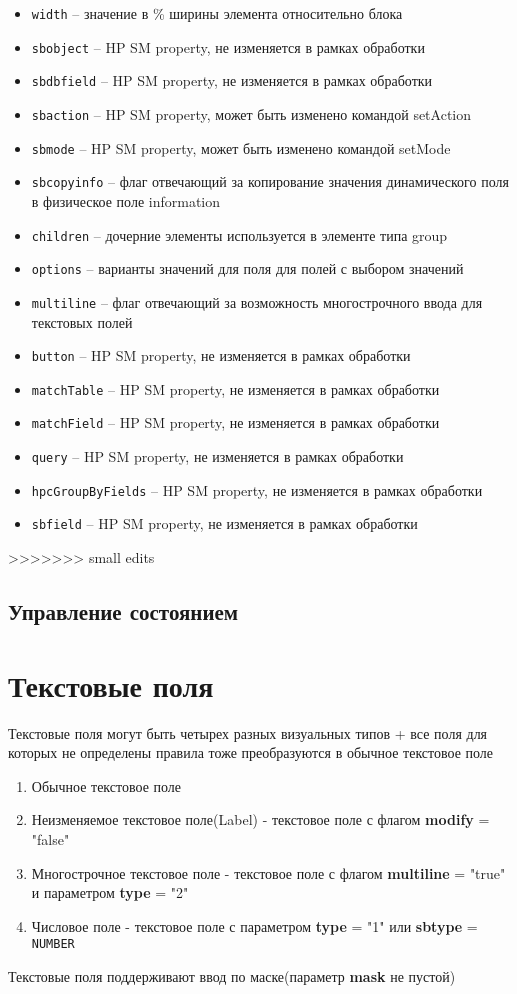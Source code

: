 \documentclass[../index.tex]{subfiles}
\begin{document}
\begin{itemize}
    \item \verb|width| -- значение в \% ширины элемента относительно блока
    \item \verb|sbobject| -- HP SM property, не изменяется в рамках обработки
    \item \verb|sbdbfield| -- HP SM property, не изменяется в рамках обработки
    \item \verb|sbaction| -- HP SM property, может быть изменено командой setAction
    \item \verb|sbmode| -- HP SM property, может быть изменено командой setMode
    \item \verb|sbcopyinfo| -- флаг отвечающий за копирование значения динамического поля в физическое поле information
    \item \verb|children| -- дочерние элементы используется в элементе типа group
    \item \verb|options| -- варианты значений для поля для полей с выбором значений
    \item \verb|multiline| -- флаг отвечающий за возможность многострочного ввода для текстовых полей
    \item \verb|button| -- HP SM property, не изменяется в рамках обработки
    \item \verb|matchTable| -- HP SM property, не изменяется в рамках обработки
    \item \verb|matchField| -- HP SM property, не изменяется в рамках обработки
    \item \verb|query| -- HP SM property, не изменяется в рамках обработки
    \item \verb|hpcGroupByFields| -- HP SM property, не изменяется в рамках обработки
    \item \verb|sbfield| -- HP SM property, не изменяется в рамках обработки
\end{itemize}
>>>>>>> small edits

\subsection{Управление состоянием}

\section{Текстовые поля}
    Текстовые поля могут быть четырех разных визуальных типов + все поля для которых не определены правила тоже преобразуются в обычное текстовое поле
    \begin{enumerate}
        \item Обычное текстовое поле
        \item Неизменяемое текстовое поле(Label) - текстовое поле с флагом \textbf{modify} = "false"
        \item Многострочное текстовое поле - текстовое поле с флагом \textbf{multiline} = "true" и параметром \textbf{type} = "2"
        \item Числовое поле - текстовое поле с параметром \textbf{type} = "1" или \textbf{sbtype} = \verb|NUMBER|
    \end{enumerate}
    Текстовые поля поддерживают ввод по маске(параметр \textbf{mask} не пустой)
\end{document}
